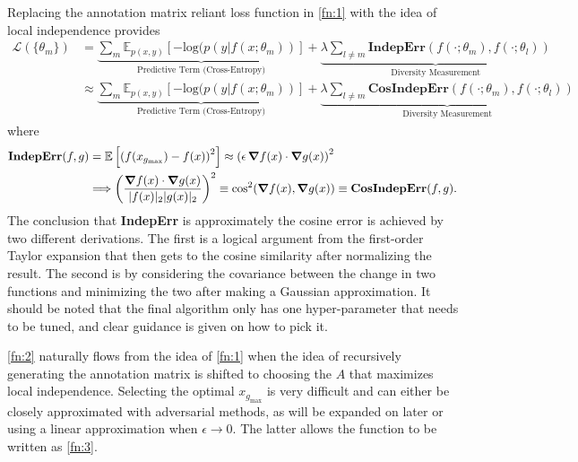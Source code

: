 \documentclass[twoside,11pt]{article}
\begin{document}
Replacing the annotation matrix reliant loss function in \cref{fn:1} with the idea of local independence provides 
\begin{align}
\mathcal{L}(\{ \theta_m \}) & = \underbrace{\sum_m \mathbb{E}_{p(x,y)} \left[ - \text{log}(p(y|f(x; \theta_m))\right]}_\text{Predictive Term (Cross-Entropy)} + \underbrace{\lambda\sum_{l\neq m}\textbf{IndepErr}\left(f(\cdot ;\theta_m), f(\cdot ; \theta_l)\right)}_\text{Diversity Measurement} \label{fn:2}\\
&\approx \underbrace{\sum_m \mathbb{E}_{p(x,y)} \left[ - \text{log}(p(y|f(x; \theta_m))\right]}_\text{Predictive Term (Cross-Entropy)} + \underbrace{\lambda\sum_{l\neq m}\textbf{CosIndepErr}\left(f(\cdot ;\theta_m), f(\cdot ; \theta_l)\right)}_\text{Diversity Measurement} \label{fn:3}
\end{align}
where
\begin{align*}
\textbf{IndepErr}(f,g) & = \mathbb{E}\left[\left(f(x_{g_\text{max}}) - f(x)\right)^2\right] \approx \left(\epsilon \, \grad{f(x)} \cdot \grad{g(x)}\right)^2 \\
& \Longrightarrow \left(\frac{\grad{f(x)} \cdot \grad{g(x)}}{|f(x)|_2 |g(x)|_2}\right)^2 \equiv \cos[2](\grad{f(x)}, \grad{g(x)}) \equiv \textbf{CosIndepErr}(f,g).
\end{align*}
The conclusion that \textbf{IndepErr} is approximately the cosine error is achieved by two different derivations. The first is a logical argument from the first-order Taylor expansion that then gets to the cosine similarity after normalizing the result. The second is by considering the covariance between the change in two functions and minimizing the two after making a Gaussian approximation. It should be noted that the final algorithm only has one hyper-parameter that needs to be tuned, and clear guidance is given on how to pick it.

\cref{fn:2} naturally flows from the idea of \cref{fn:1} when the idea of recursively generating the annotation matrix is shifted to choosing the $A$ that maximizes local independence. Selecting the optimal $x_{g_\text{max}}$ is very difficult and can either be closely approximated with adversarial methods, as will be expanded on later or using a linear approximation when $\epsilon \rightarrow 0$. The latter allows the function to be written as \cref{fn:3}.

\end{document}

